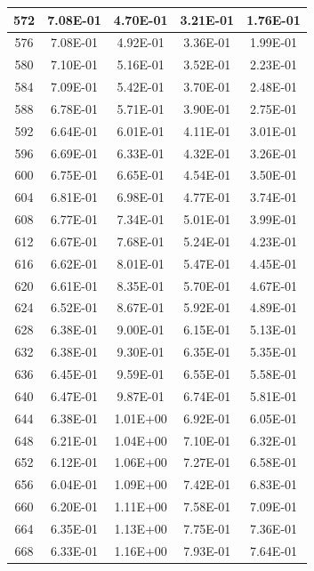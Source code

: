 \begin{longtable}{c||c|c|c|c}
        572 & 7.08E-01 & 4.70E-01 & 3.21E-01 & 1.76E-01 \\ \hline
        576 & 7.08E-01 & 4.92E-01 & 3.36E-01 & 1.99E-01 \\ \hline
        580 & 7.10E-01 & 5.16E-01 & 3.52E-01 & 2.23E-01 \\ \hline
        584 & 7.09E-01 & 5.42E-01 & 3.70E-01 & 2.48E-01 \\ \hline
        588 & 6.78E-01 & 5.71E-01 & 3.90E-01 & 2.75E-01 \\ \hline
        592 & 6.64E-01 & 6.01E-01 & 4.11E-01 & 3.01E-01 \\ \hline
        596 & 6.69E-01 & 6.33E-01 & 4.32E-01 & 3.26E-01 \\ \hline
        600 & 6.75E-01 & 6.65E-01 & 4.54E-01 & 3.50E-01 \\ \hline
        604 & 6.81E-01 & 6.98E-01 & 4.77E-01 & 3.74E-01 \\ \hline
        608 & 6.77E-01 & 7.34E-01 & 5.01E-01 & 3.99E-01 \\ \hline
        612 & 6.67E-01 & 7.68E-01 & 5.24E-01 & 4.23E-01 \\ \hline
        616 & 6.62E-01 & 8.01E-01 & 5.47E-01 & 4.45E-01 \\ \hline
        620 & 6.61E-01 & 8.35E-01 & 5.70E-01 & 4.67E-01 \\ \hline
        624 & 6.52E-01 & 8.67E-01 & 5.92E-01 & 4.89E-01 \\ \hline
        628 & 6.38E-01 & 9.00E-01 & 6.15E-01 & 5.13E-01 \\ \hline
        632 & 6.38E-01 & 9.30E-01 & 6.35E-01 & 5.35E-01 \\ \hline
        636 & 6.45E-01 & 9.59E-01 & 6.55E-01 & 5.58E-01 \\ \hline
        640 & 6.47E-01 & 9.87E-01 & 6.74E-01 & 5.81E-01 \\ \hline
        644 & 6.38E-01 & 1.01E+00 & 6.92E-01 & 6.05E-01 \\ \hline
        648 & 6.21E-01 & 1.04E+00 & 7.10E-01 & 6.32E-01 \\ \hline
        652 & 6.12E-01 & 1.06E+00 & 7.27E-01 & 6.58E-01 \\ \hline
        656 & 6.04E-01 & 1.09E+00 & 7.42E-01 & 6.83E-01 \\ \hline
        660 & 6.20E-01 & 1.11E+00 & 7.58E-01 & 7.09E-01 \\ \hline
        664 & 6.35E-01 & 1.13E+00 & 7.75E-01 & 7.36E-01 \\ \hline
        668 & 6.33E-01 & 1.16E+00 & 7.93E-01 & 7.64E-01 \\ \hline

\end{longtable}
